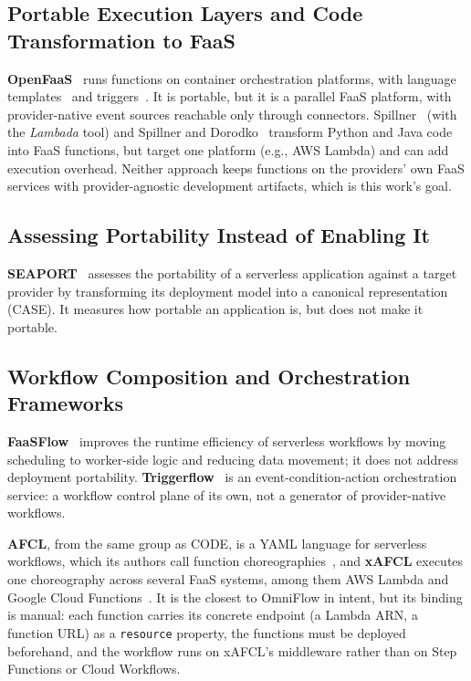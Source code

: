 \subsection{Portable Execution Layers and Code Transformation to FaaS}

\textbf{OpenFaaS}~\cite{openFaaS} runs functions on container orchestration platforms, with
language templates~\cite{openFaaSTemplates} and triggers~\cite{openFaaSTriggers}. It is portable,
but it is a parallel FaaS platform, with provider-native event sources reachable only through
connectors.
Spillner~\cite{spillner2017pythonfaas} (with the \textit{Lambada} tool) and Spillner and
Dorodko~\cite{spillnerDorodko2017javaLambda} transform Python and Java code into FaaS functions,
but target one platform (e.g., AWS Lambda) and can add execution overhead. Neither approach keeps
functions on the providers' own FaaS services with provider-agnostic development artifacts, which
is this work's goal.

\subsection{Assessing Portability Instead of Enabling It}

\textbf{SEAPORT}~\cite{yussupov2020seaport} assesses the portability of a serverless application
against a target provider by transforming its deployment model into a canonical representation
(CASE). It measures how portable an application is, but does not make it portable.

\subsection{Workflow Composition and Orchestration Frameworks}

\textbf{FaaSFlow}~\cite{li2022faasflow} improves the runtime efficiency of serverless workflows by
moving scheduling to worker-side logic and reducing data movement; it does not address deployment
portability. \textbf{Triggerflow}~\cite{garciaLopez2020triggerflow} is an event-condition-action
orchestration service: a workflow control plane of its own, not a generator of provider-native
workflows.

\textbf{AFCL}, from the same group as CODE, is a YAML language for serverless workflows, which its
authors call function choreographies~\cite{ristov2021afcl}, and \textbf{xAFCL} executes one
choreography across several FaaS systems, among them AWS Lambda and Google Cloud
Functions~\cite{ristov2023xafcl}. It is the closest to OmniFlow in intent, but its binding is
manual: each function carries its concrete endpoint (a Lambda ARN, a function URL) as a
\texttt{resource} property, the functions must be deployed beforehand, and the workflow runs on
xAFCL's middleware rather than on Step Functions or Cloud Workflows.

